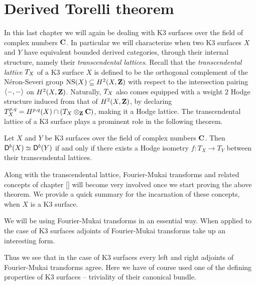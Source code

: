 \section{Derived Torelli theorem}
\label{Chapter: Derived Torelli theorem}


In this last chapter we will again be dealing with K3 surfaces over the field of complex numbers $\mathbf C$. In particular we will characterize when two K3 surfaces $X$ and $Y$ have equivalent bounded derived categories, through their internal structure, namely their \emph{transcendental lattices}. Recall that the \emph{transcendental lattice} $T_{X}$ of a K3 surface $X$ is defined to be the orthogonal complement of the Néron-Severi group $\operatorname{NS}(X) \subseteq H^{2}(X, \mathbf Z)$ with respect to the intersection pairing $\langle -, - \rangle$ on $H^{2}(X, \mathbf Z)$.
Naturally, $T_{X}$ also comes equipped with a weight $2$ Hodge structure induced from that of $H^{2}(X, \mathbf Z)$, by declaring $T_{X}^{p,q} = H^{p,q}(X) \cap (T_{X} \otimes_\mathbf Z \mathbf C)$, making it a Hodge lattice. The transcendental lattice of a K3 surface plays a prominent role in the following theorem. 


\begin{theorem}
    \label{Derived Torelli}
    Let $X$ and $Y$ be K3 surfaces over the field of complex numbers $\mathbf C$. Then $\mathsf{D}^b(X) \simeq \mathsf{D}^b(Y)$ if and only if there exists a Hodge isometry $f\colon T_X \to T_Y$ between their transcendental lattices.
\end{theorem}

Along with the transcendental lattice, Fourier-Mukai transforms and related concepts of chapter \ref{} will become very involved once we start proving the above theorem. We provide a quick summary for the incarnation of these concepts, when $X$ is a K3 surface. 



We will be using Fourier-Mukai transforms in an essential way. When applied to the case of K3 surfaces adjoints of Fourier-Mukai transforms take up an interesting form.

Thus we see that in the case of K3 surfaces every left and right adjoints of Fourier-Mukai transforms agree.
Here we have of course used one of the defining properties of K3 surfaces -- triviality of their canonical bundle.


